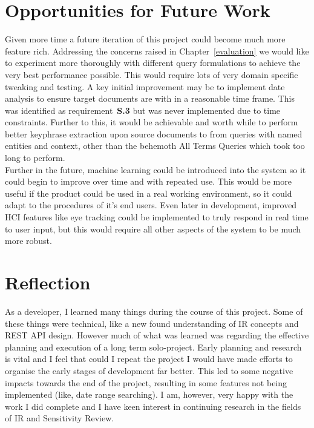 \documentclass{l4proj}
\begin{document}
\section{Opportunities for Future Work}
Given more time a future iteration of this project could become much more feature rich. Addressing the concerns raised in Chapter~\ref{evaluation} we would like to experiment more thoroughly with different query formulations to achieve the very best performance possible. This would require lots of very domain specific tweaking and testing. A key initial improvement may be to implement date analysis to ensure target documents are with in a reasonable time frame. This was identified as requirement~\textbf{S.3} but was never implemented due to time constraints.
Further to this, it would be achievable and worth while to perform better keyphrase extraction upon source documents to from queries with named entities and context, other than the behemoth All Terms Queries which took too long to perform. \\
Further in the future, machine learning could be introduced into the system so it could begin to improve over time and with repeated use. This would be more useful if the product could be used in a real working environment, so it could adapt to the procedures of it's end users.
Even later in development, improved HCI features like eye tracking could be implemented to truly respond in real time to user input, but this would require all other aspects of the system to be much more robust.

\section{Reflection}
As a developer, I learned many things during the course of this project. Some of these things were technical, like a new found understanding of IR concepts and REST API design. However much of what was learned was regarding the effective planning and execution of a long term solo-project. Early planning and research is vital and I feel that could I repeat the project I would have made efforts to organise the early stages of development far better. This led to some negative impacts towards the end of the project, resulting in some features not being implemented (like, date range searching). I am, however, very happy with the work I did complete and I have keen interest in continuing research in the fields of IR and Sensitivity Review.
\end{document}

